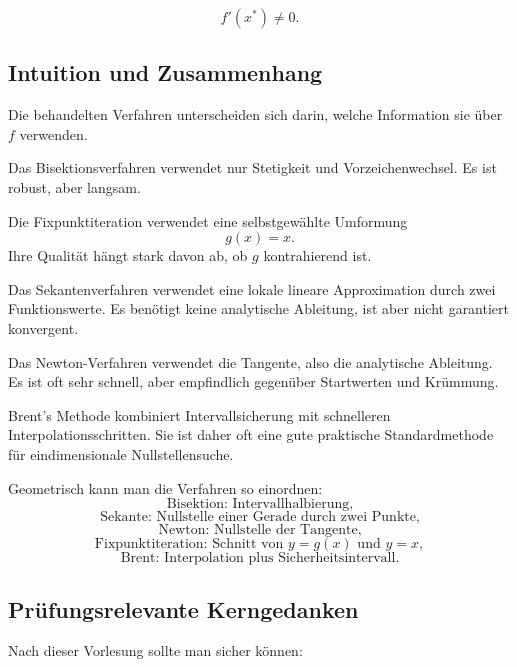 \documentclass[10pt, letterpaper]{article}
\begin{document}
\[
\boxed{
f'(x^\ast)\neq 0.
}
\]

\subsection{Intuition und Zusammenhang}

Die behandelten Verfahren unterscheiden sich darin, welche Information sie über \(f\) verwenden.

Das Bisektionsverfahren verwendet nur Stetigkeit und Vorzeichenwechsel. Es ist robust, aber langsam.

Die Fixpunktiteration verwendet eine selbstgewählte Umformung
\[
g(x)=x.
\]
Ihre Qualität hängt stark davon ab, ob \(g\) kontrahierend ist.

Das Sekantenverfahren verwendet eine lokale lineare Approximation durch zwei Funktionswerte. Es benötigt keine analytische Ableitung, ist aber nicht garantiert konvergent.

Das Newton-Verfahren verwendet die Tangente, also die analytische Ableitung. Es ist oft sehr schnell, aber empfindlich gegenüber Startwerten und Krümmung.

Brent's Methode kombiniert Intervallsicherung mit schnelleren Interpolationsschritten. Sie ist daher oft eine gute praktische Standardmethode für eindimensionale Nullstellensuche.

Geometrisch kann man die Verfahren so einordnen:
\[
\text{Bisektion: Intervallhalbierung,}
\]
\[
\text{Sekante: Nullstelle einer Gerade durch zwei Punkte,}
\]
\[
\text{Newton: Nullstelle der Tangente,}
\]
\[
\text{Fixpunktiteration: Schnitt von } y=g(x) \text{ und } y=x,
\]
\[
\text{Brent: Interpolation plus Sicherheitsintervall.}
\]

\subsection{Prüfungsrelevante Kerngedanken}

Nach dieser Vorlesung sollte man sicher können:
\end{document}
